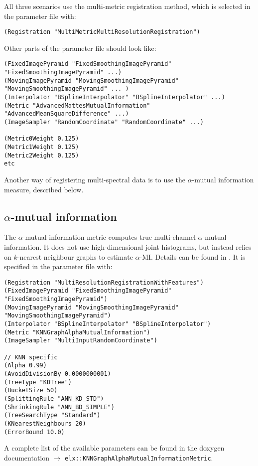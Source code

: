 \documentclass[]{report}
\begin{document}
All three scenarios use the multi-metric registration method, which
is selected in the parameter file with:
\small
\begin{verbatim}
(Registration "MultiMetricMultiResolutionRegistration")
\end{verbatim}
\normalsize Other parts of the parameter file should look like:
\small
\begin{verbatim}
(FixedImagePyramid "FixedSmoothingImagePyramid" "FixedSmoothingImagePyramid" ...)
(MovingImagePyramid "MovingSmoothingImagePyramid" "MovingSmoothingImagePyramid" ... )
(Interpolator "BSplineInterpolator" "BSplineInterpolator" ...)
(Metric "AdvancedMattesMutualInformation" "AdvancedMeanSquareDifference" ...)
(ImageSampler "RandomCoordinate" "RandomCoordinate" ...)

(Metric0Weight 0.125)
(Metric1Weight 0.125)
(Metric2Weight 0.125)
etc
\end{verbatim}
\normalsize

Another way of registering multi-spectral data is to use the
$\alpha$-mutual information measure, described below.

\subsection{$\alpha$-mutual information}

The $\alpha$-mutual information metric computes true multi-channel
$\alpha$-mutual information. It does not use high-dimensional joint
histograms, but instead relies on $k$-nearest neighbour graphs to
estimate $\alpha$-MI. Details can be found in \cite{Staring09}. It
is specified in the parameter file with: \small
\begin{verbatim}
(Registration "MultiResolutionRegistrationWithFeatures")
(FixedImagePyramid "FixedSmoothingImagePyramid" "FixedSmoothingImagePyramid")
(MovingImagePyramid "MovingSmoothingImagePyramid" "MovingSmoothingImagePyramid")
(Interpolator "BSplineInterpolator" "BSplineInterpolator")
(Metric "KNNGraphAlphaMutualInformation")
(ImageSampler "MultiInputRandomCoordinate")

// KNN specific
(Alpha 0.99)
(AvoidDivisionBy 0.0000000001)
(TreeType "KDTree")
(BucketSize 50)
(SplittingRule "ANN_KD_STD")
(ShrinkingRule "ANN_BD_SIMPLE")
(TreeSearchType "Standard")
(KNearestNeighbours 20)
(ErrorBound 10.0)
\end{verbatim}
\normalsize A complete list of the available parameters can be found in the
doxygen documentation $\rightarrow$ \linebreak
\texttt{elx::KNNGraphAlphaMutualInformationMetric}.
\end{document}

